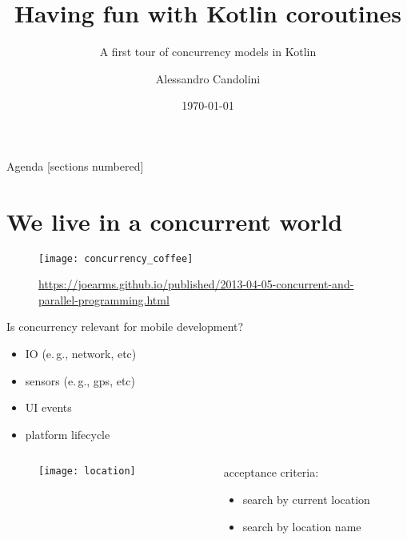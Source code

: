 \documentclass[10pt]{beamer}
\title{Having fun with Kotlin coroutines}
\subtitle{A first tour of concurrency models in Kotlin}
\date{\today}
\author[A. Candolini]{Alessandro Candolini}
\providecommand{\eg}{e.\,g.}
\begin{document}
\maketitle

\begin{frame}{Agenda}
  [sections numbered]
  \tableofcontents[hideallsubsections]
\end{frame}

\section{We live in a concurrent world}
\begin{frame}[fragile]
	\begin{figure}
		\centering
		\texttt{[image: concurrency\_coffee]}
		\caption{\url{https://joearms.github.io/published/2013-04-05-concurrent-and-parallel-programming.html}}
	\end{figure}
\end{frame}
\begin{frame}[fragile]
Is concurrency relevant for mobile development?
	\begin{itemize} 
		\item<2-> IO (\eg, network, etc) 
		\item<3-> sensors (\eg, gps, etc) 
		\item<4-> UI events 
		\item<5-> platform lifecycle 
	\end{itemize}
\end{frame}
\begin{frame}[fragile]
\begin{columns}
\begin{column}{0.4\textwidth}
	\begin{center}
	\begin{figure}
		\centering
		\texttt{[image: location]}
	\end{figure}
	\end{center}
\end{column}
\begin{column}{0.6\textwidth}
	acceptance criteria:
	\begin{itemize}
		\item search by current location 
		\item search by location name 
	\end{itemize}
\end{column}
\end{columns}
\end{frame}
\end{document}
